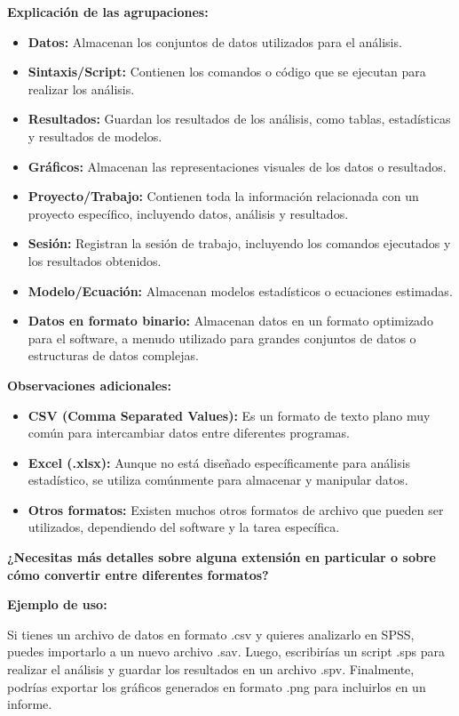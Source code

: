 \documentclass[
  jou,
  floatsintext,
  longtable,
  a4paper,
  nolmodern,
  notxfonts,
  notimes,
  colorlinks=true,linkcolor=blue,citecolor=blue,urlcolor=blue]{apa7}
\providecommand{\tightlist}{%
  \setlength{\itemsep}{0pt}\setlength{\parskip}{0pt}}
\begin{document}
\textbf{Explicación de las agrupaciones:}

\begin{itemize}
\tightlist
\item
  \textbf{Datos:} Almacenan los conjuntos de datos utilizados para el
  análisis.
\item
  \textbf{Sintaxis/Script:} Contienen los comandos o código que se
  ejecutan para realizar los análisis.
\item
  \textbf{Resultados:} Guardan los resultados de los análisis, como
  tablas, estadísticas y resultados de modelos.
\item
  \textbf{Gráficos:} Almacenan las representaciones visuales de los
  datos o resultados.
\item
  \textbf{Proyecto/Trabajo:} Contienen toda la información relacionada
  con un proyecto específico, incluyendo datos, análisis y resultados.
\item
  \textbf{Sesión:} Registran la sesión de trabajo, incluyendo los
  comandos ejecutados y los resultados obtenidos.
\item
  \textbf{Modelo/Ecuación:} Almacenan modelos estadísticos o ecuaciones
  estimadas.
\item
  \textbf{Datos en formato binario:} Almacenan datos en un formato
  optimizado para el software, a menudo utilizado para grandes conjuntos
  de datos o estructuras de datos complejas.
\end{itemize}

\textbf{Observaciones adicionales:}

\begin{itemize}
\tightlist
\item
  \textbf{CSV (Comma Separated Values):} Es un formato de texto plano
  muy común para intercambiar datos entre diferentes programas.
\item
  \textbf{Excel (.xlsx):} Aunque no está diseñado específicamente para
  análisis estadístico, se utiliza comúnmente para almacenar y manipular
  datos.
\item
  \textbf{Otros formatos:} Existen muchos otros formatos de archivo que
  pueden ser utilizados, dependiendo del software y la tarea específica.
\end{itemize}

\textbf{¿Necesitas más detalles sobre alguna extensión en particular o
sobre cómo convertir entre diferentes formatos?}

\textbf{Ejemplo de uso:}

Si tienes un archivo de datos en formato .csv y quieres analizarlo en
SPSS, puedes importarlo a un nuevo archivo .sav. Luego, escribirías un
script .sps para realizar el análisis y guardar los resultados en un
archivo .spv. Finalmente, podrías exportar los gráficos generados en
formato .png para incluirlos en un informe.
\end{document}
